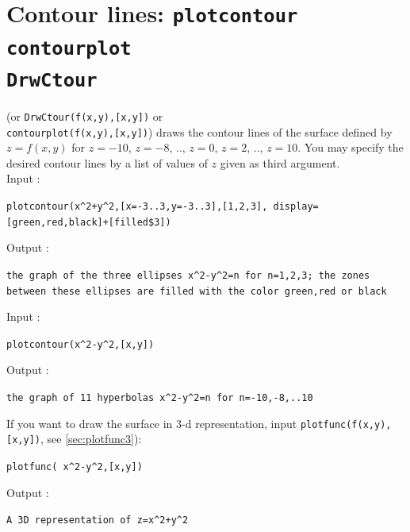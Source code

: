 \documentclass[a4paper,11pt]{book}
\begin{document}
\section{Contour lines: {\tt plotcontour contourplot \\DrwCtour}}\label{sec:plotcontour}
 (or {\tt DrwCtour(f(x,y),[x,y])} or \\
 {\tt contourplot(f(x,y),[x,y])})
draws the contour lines of the surface defined by $z=f(x,y)$ for $z=-10$, 
$z=-8$, .., $z=0$, $z=2$, .., $z=10$. You may specify the desired contour
lines by a list of values of $z$ given as third argument.\\
Input :
\begin{center}{\tt  plotcontour(x\verb|^|2+y\verb|^|2,[x=-3..3,y=-3..3],[1,2,3], display=[green,red,black]+[filled\$3])}\end{center}
Output :
\begin{center}{\tt  the graph of the three ellipses x\verb|^|2-y\verb|^|2=n for n=1,2,3; the zones between these ellipses are filled with the color green,red or black}\end{center}
Input :
\begin{center}{\tt  plotcontour(x\verb|^|2-y\verb|^|2,[x,y])}\end{center}
Output :
\begin{center}{\tt  the graph of 11 hyperbolas x\verb|^|2-y\verb|^|2=n for n=-10,-8,..10}\end{center}

If you want to draw the surface in 3-d representation, 
input {\tt plotfunc(f(x,y),[x,y])}, see \ref{sec:plotfunc3}):
\begin{center}{\tt plotfunc( x\verb|^|2-y\verb|^|2,[x,y])}\end{center}
Output :
\begin{center}{\tt A 3D representation of z=x\verb|^|2+y\verb|^|2}\end{center}
\end{document}
